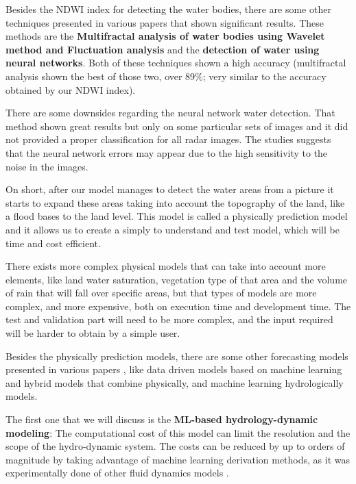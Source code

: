\documentclass[12pt, a4paper]{report}
\begin{document}
Besides the NDWI index for detecting the water bodies, there are some other techniques presented in various papers \cite{Multifractal water analysis, NDWI Comparison} that shown significant results. These methods are the \textbf{Multifractal analysis of water bodies using Wavelet method and Fluctuation analysis} and the \textbf{detection of water using neural networks}. Both of these techniques shown a high accuracy (multifractal analysis shown the best of those two, over 89\%; very similar to the accuracy obtained by our NDWI index).
\par 
There are some downsides regarding the neural network water detection. That method shown great results but only on some particular sets of images and it did not provided a proper classification for all radar images. The studies \cite{NDWI Comparison} suggests that the neural network errors may appear due to the high sensitivity to the noise in the images. 
\par 

On short, after our model manages to detect the water areas from a picture it starts to expand these areas taking into account the topography of the land, like a flood bases to the land level. This model is called a physically prediction model and it allows us to create a simply to understand and test model, which will be time and cost efficient. 
\par 

There exists more complex physical models that can take into account more elements, like land water saturation, vegetation type of that area and the volume of rain that will fall over specific areas, but that types of models are more complex, and more expensive, both on execution time and development time. The test and validation part will need to be more complex, and the input required will be harder to obtain by a simple user. 
\par 

Besides the physically prediction models, there are some other forecasting models presented in various papers \cite{Flood forecasting models}, like data driven models based on machine learning and hybrid models that combine physically, and machine learning hydrologically models.\par 

The first one that we will discuss is the \textbf{ML-based hydrology-dynamic modeling}: The computational cost of this model can limit the resolution and the scope of the hydro-dynamic system. The costs can be reduced by up to orders of magnitude by taking advantage of machine learning derivation methods, as it was experimentally done of other fluid dynamics models \cite{Yohai}.
\par 
\end{document}
